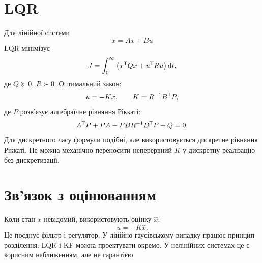 \section{LQR}

Для лінійної системи
\[
\dot x=Ax+Bu
\]
LQR мінімізує
\[
J=\int_0^\infty \left(x^{\mathsf{T}} Qx+u^{\mathsf{T}} Ru\right)\mathrm{d} t,
\]
де $Q\succeq0$, $R\succ0$. Оптимальний закон:
\[
u=-Kx,\qquad K=R^{-1}B^{\mathsf{T}} P,
\]
де $P$ розв'язує алгебраїчне рівняння Ріккаті:
\[
A^{\mathsf{T}} P+PA-PBR^{-1}B^{\mathsf{T}} P+Q=0.
\]
Для дискретного часу формули подібні, але використовується дискретне рівняння Ріккаті. Не можна механічно переносити неперервний $K$ у дискретну реалізацію без дискретизації.

\section{Зв'язок з оцінюванням}

Коли стан $x$ невідомий, використовують оцінку $\hat x$:
\[
u=-K\hat x.
\]
Це поєднує фільтр і регулятор. У лінійно-гаусівському випадку працює принцип розділення: LQR і KF можна проектувати окремо. У нелінійних системах це є корисним наближенням, але не гарантією.
